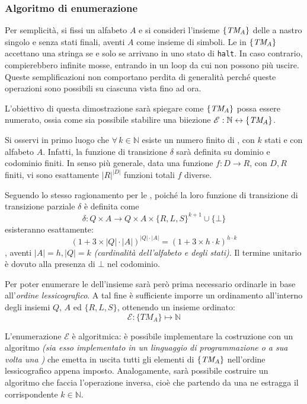 \documentclass[italian, 10pt]{article}
\begin{document}
\subsubsection{Algoritmo di enumerazione}

Per semplicità, si fissi un alfabeto \(A\) e si consideri l'insieme \(\{\textit{TM}_A\}\) delle \TM a nastro singolo e senza stati finali, aventi \(A\) come insieme di simboli.
Le \TM in \(\{\textit{TM}_A\}\) accettano una stringa se e solo se arrivano in uno stato di \texttt{halt}. In caso contrario, compierebbero infinite mosse, entrando in un loop da cui non possono più uscire.
Queste semplificazioni non comportano perdita di generalità perché queste operazioni sono possibili su ciascuna \TM vista fino ad ora.

L'obiettivo di questa dimostrazione sarà spiegare come \(\{\textit{TM}_A\}\) possa essere numerato, ossia come sia possibile stabilire una biiezione \(\mathscr{E}: \mathbb{N} \leftrightarrow \{\textit{TM}_A\}\).

Si osservi in primo luogo che \(\forall \, k \in \mathbb{N}\) esiste un numero finito di \TM, con \(k\) stati e con alfabeto \(A\).
Infatti, la funzione di transizione \(\delta\) sarà definita su dominio e codominio finiti.
In senso più generale, data una funzione \(f: D \rightarrow R\), con \(D, R\) finiti, vi sono esattamente \(|R|^{|D|}\) funzioni totali \(f\) diverse.

Seguendo lo stesso ragionamento per le \TM, poiché la loro funzione di transizione di transizione parziale \(\delta\) è definita come
\[ \delta : Q \times A \rightarrow Q \times A \times \{R, L, S\}^{k+1} \cup \{\bot\}\]
esisteranno esattamente:
\[ (1 + 3 \times |Q| \cdot |A|)^{|Q| \cdot |A|} = (1 + 3 \times h \cdot k)^{h \cdot k} \]
\TM, aventi \(|A| = h, |Q| = k\) \textit{(cardinalità dell'alfabeto e degli stati)}.
Il termine unitario è dovuto alla presenza di \(\bot\) nel codominio.

Per poter enumerare le \TM dell'insieme sarà però prima necessario ordinarle in base all'\textit{ordine lessicografico}.
A tal fine è sufficiente imporre un ordinamento all'interno degli insiemi \(Q\), \(A\) ed \(\{R, L, S\}\), ottenendo un insieme ordinato:
\[ \mathscr{E}: \{TM_A\} \mapsto \mathbb{N} \]

L'enumerazione \(\mathscr{E}\) è algoritmica: è possibile implementare la costruzione con un algoritmo \textit{(sia esso implementato in un linguaggio di programmazione o a sua volta una \TM)} che emetta in uscita tutti gli elementi di \(\{\textit{TM}_A\}\) nell'ordine lessicografico appena imposto.
Analogamente, sarà possibile costruire un algoritmo che faccia l'operazione inversa, cioè che partendo da una \TM ne estragga il corrispondente \(k \in \mathbb{N}\).
\end{document}
